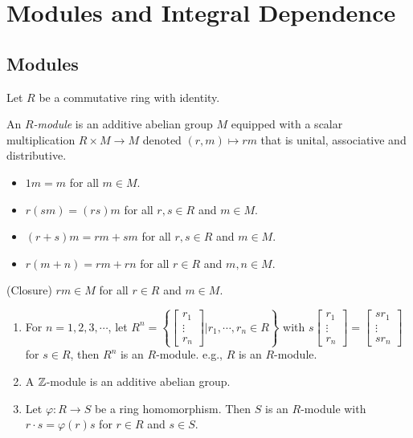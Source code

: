 \chapter{Modules and Integral Dependence}

\section*{Modules}

Let $R$ be a commutative ring with identity.

\begin{definition}
    An \emph{$R$-module} is an additive abelian group $M$ equipped with a scalar multiplication $R \times M \to M$ denoted $(r,m) \mapsto rm$ that is unital, associative and distributive.
    \begin{itemize}
        \item $1m = m$ for all $m \in M$.
        \item $r(sm) = (rs)m$ for all $r,s \in R$ and $m \in M$.
        \item $(r+s)m = rm + sm$ for all $r,s \in R$ and $m \in M$.
        \item $r(m+n) = rm + rn$ for all $r \in R$ and $m,n \in M$.
    \end{itemize}
    \quad (Closure) $rm \in M$ for all $r \in R$ and $m \in M$. 
\end{definition}

\begin{example}
    \begin{enumerate}
        \item 
            For $n = 1,2,3,\cdots$, let $R^{n} = \left\{\begin{bmatrix}r_1 \\ \vdots \\ r_n\end{bmatrix}\mathrel{\Bigg |} r_1,\cdots,r_n \in R\right\}$ with $s \begin{bmatrix}r_1 \\ \vdots \\ r_n\end{bmatrix} = \begin{bmatrix}sr_1 \\ \vdots \\ sr_n\end{bmatrix}$ for $s \in R$, then $R^{n}$ is an $R$-module. e.g., $R$ is an $R$-module.
        \item A $\mathbb{Z}$-module is an additive abelian group.
        \item Let $\varphi: R \to S$ be a ring homomorphism. Then $S$ is an $R$-module with $r \cdot s = \varphi(r)s$ for $r \in R$ and $s \in S$.
    \end{enumerate}
\end{example}

